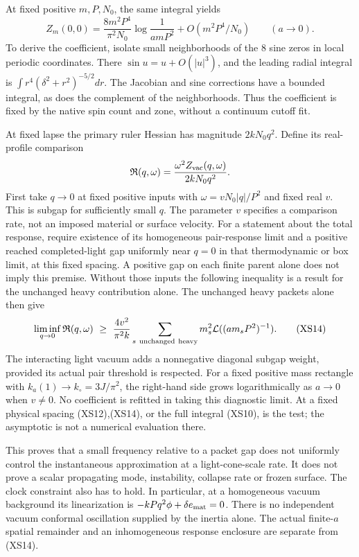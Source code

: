 \documentclass[11pt]{article}
\begin{document}
At fixed positive $m,P,N_0$, the same integral yields
\begin{equation}
 Z_m(0,0)=
 \frac{8m^2P^4}{\pi^2N_0}
       \log\frac1{amP^2}
       +O(m^2P^4/N_0)\qquad(a\to0).
 \tag{XS13}
\end{equation}
To derive the coefficient, isolate small neighborhoods of
the 8 sine zeros in local periodic coordinates.
There $\sin u=u+O(|u|^3)$, and the leading radial integral
is $\int r^4(\delta^2+r^2)^{-5/2}dr$.
The Jacobian and sine corrections have a bounded integral,
as does the complement of the neighborhoods.
Thus the coefficient is fixed by the native spin count and
zone, without a continuum cutoff fit.

At fixed lapse the primary ruler Hessian has magnitude
$2kN_0q^2$.  Define its real-profile comparison
\[
 {\mathfrak R}(q,\omega)
       =\frac{\omega^2Z_{\rm vac}(q,\omega)}
                        {2kN_0q^2}.
\]
First take $q\to0$ at fixed positive inputs with
$\omega=vN_0|q|/P^2$ and fixed real $v$.
This is subgap for sufficiently small $q$.
The parameter $v$ specifies a comparison rate, not an imposed
material or surface velocity.  For a statement about the total
response, require existence of its homogeneous pair-response
limit and a positive reached completed-light gap uniformly
near $q=0$ in that thermodynamic or box limit, at this fixed
spacing.  A positive gap on each finite parent alone does
not imply this premise.  Without those inputs the following inequality
is a result for the unchanged heavy contribution alone.
The unchanged heavy packets alone then give
\begin{equation}
 \liminf_{q\to0}{\mathfrak R}(q,\omega)
 \ \geq\
 \frac{4v^2}{\pi^2k}
       \sum_{s\ {\rm unchanged\ heavy}}m_s^2
                  {\cal L}((am_sP^2)^{-1}) .
 \tag{XS14}
\end{equation}
The interacting light vacuum adds a nonnegative diagonal
subgap weight, provided its actual pair threshold is respected.
For a fixed positive mass rectangle with
$k_a(1)\to k_\circ=3J/\pi^2$, the right-hand side grows
logarithmically as $a\to0$ when $v\ne0$.
No coefficient is refitted in taking this diagnostic limit.
At a fixed physical spacing (XS12),(XS14), or the full
integral (XS10), is the test; the asymptotic is not a
numerical evaluation there.

This proves that a small frequency relative to a packet gap
does not uniformly control the instantaneous approximation
at a light-cone-scale rate.  It does not prove a scalar
propagating mode, instability, collapse rate or frozen surface.
The clock constraint also has to hold.  In particular, at a
homogeneous vacuum background its linearization is
$-kPq^2\phi+\delta e_{\rm mat}=0$.
There is no independent vacuum conformal oscillation supplied
by the inertia alone.
The actual finite-$a$ spatial remainder and an inhomogeneous
response enclosure are separate from (XS14).
\end{document}
